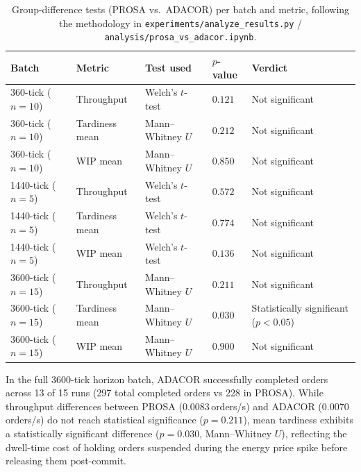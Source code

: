 \documentclass[twocolumn,10pt,a4paper]{article}
\newcommand{\file}[1]{\texttt{#1}}
\begin{document}
\begin{table}[t]
\centering
\small
\begin{tabular}{@{}p{2.4cm}p{2.2cm}p{2.8cm}p{1.6cm}p{6.6cm}@{}}
\toprule
\textbf{Batch} & \textbf{Metric} & \textbf{Test used} & \textbf{$p$-value} & \textbf{Verdict} \\
\midrule
360-tick ($n{=}10$) & Throughput & Welch's $t$-test & $0.121$ & Not significant \\
360-tick ($n{=}10$) & Tardiness mean & Mann--Whitney $U$ & $0.212$ & Not significant \\
360-tick ($n{=}10$) & WIP mean & Mann--Whitney $U$ & $0.850$ & Not significant \\
1440-tick ($n{=}5$) & Throughput & Welch's $t$-test & $0.572$ & Not significant \\
1440-tick ($n{=}5$) & Tardiness mean & Welch's $t$-test & $0.774$ & Not significant \\
1440-tick ($n{=}5$) & WIP mean & Welch's $t$-test & $0.136$ & Not significant \\
3600-tick ($n{=}15$) & Throughput & Mann--Whitney $U$ & $0.211$ & Not significant \\
3600-tick ($n{=}15$) & Tardiness mean & Mann--Whitney $U$ & $0.030$ & Statistically significant ($p<0.05$) \\
3600-tick ($n{=}15$) & WIP mean & Mann--Whitney $U$ & $0.900$ & Not significant \\
\bottomrule
\end{tabular}
\caption{Group-difference tests (PROSA vs.\ ADACOR) per batch and metric, following the methodology in \file{experiments/analyze\_results.py} / \file{analysis/prosa\_vs\_adacor.ipynb}.}
\label{tab:mc-sig}
\end{table}

In the full 3600-tick horizon batch, ADACOR successfully completed orders across 13 of 15 runs (297 total completed orders vs 228 in PROSA). While throughput differences between PROSA ($0.0083$\,orders/s) and ADACOR ($0.0070$\,orders/s) do not reach statistical significance ($p=0.211$), mean tardiness exhibits a statistically significant difference ($p=0.030$, Mann--Whitney $U$), reflecting the dwell-time cost of holding orders suspended during the energy price spike before releasing them post-commit.
\end{document}
